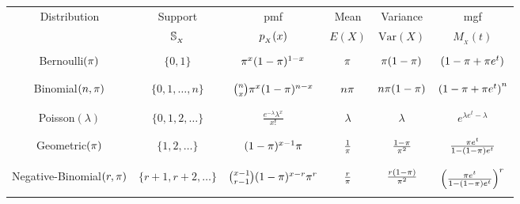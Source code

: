\documentclass[compress]{beamer}
\begin{document}
\begin{frame}
\tiny
\begin{tabular}{|c|c|c|c|c|c|}
\hline
  \hline
 Distribution & Support  &  pmf    & Mean   &  Variance  & mgf   \\
& $\support[X]$  &   $p_{_X}(x)$   &  $E(X)$  &   $\text{Var}(X)$  &  $M_{_X}(t)$  \\
 \hline \hline
  & & & & & \\
Bernoulli$(\pi)$ &$ \{0, 1\}$ & $ \pi^x (1-\pi)^{1-x}  $ & $\pi$  & $\pi(1-\pi)$&   $\left( 1-\pi+\pi e^t\right)$   \\
 & & & & & \\
 \hline
 \hline
 & & & & & \\
Binomial$(n, \pi)$ &$ \{0, 1, \ldots, n\}$ & ${n \choose x} \pi^x (1-\pi)^{n-x}  $ & $n\pi$  & $n\pi(1-\pi)$&   $\left( 1-\pi+\pi e^t\right)^n$   \\
 & & & & & \\
 \hline
 \hline
 & & & & & \\
Poisson$( \lambda)$ &$ \{0, 1, 2, \ldots \}$ & $  \frac{e^{-\lambda}\lambda^x}{x!} $ & $ \lambda$  & $ \lambda$&   $e^{ \lambda e^t-  \lambda}  $   \\
 & & & & & \\
 \hline
  \hline
   & & & & & \\
  Geometric$( \pi)$ &$ \{1, 2, \ldots \}$ & $ (1-\pi)^{x-1}\pi  $ & $ \frac{1}{\pi} $  & $ \frac{1-\pi}{\pi^2} $&   $ \frac{ {\pi} e^t}{1-(1-\pi) e^{t}}    $   \\
 & & & & & \\
 \hline
 \hline 
 & & & & & \\
Negative-Binomial$(r,  \pi)$ &$ \{r+1, r+2, \ldots \}$ & $ {{x-1}\choose{r-1}}(1-\pi)^{x-r}\pi^{r}  $ & $ \frac{r}{\pi} $  & $ \frac{r(1-\pi)}{\pi^2} $&   $\left( \frac{  \pi e^t}{1-(1-\pi) e^{t}}  \right)^r  $   \\
 & & & & & \\
 \hline
  \hline
\end{tabular}
\end{frame}
\end{document}
